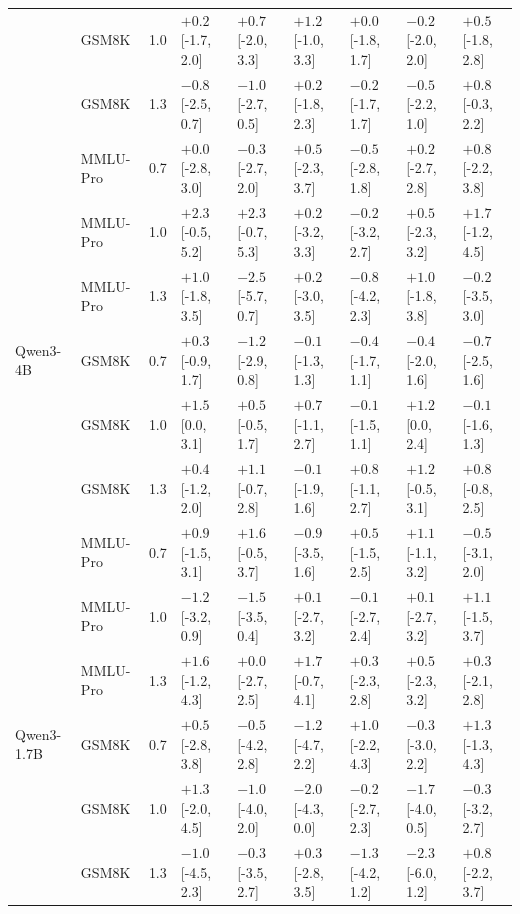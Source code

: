 \begin{tabular}{llcllllll}
 & GSM8K & 1.0 & $+0.2$ [-1.7, 2.0] & $+0.7$ [-2.0, 3.3] & $+1.2$ [-1.0, 3.3] & $+0.0$ [-1.8, 1.7] & $-0.2$ [-2.0, 2.0] & $+0.5$ [-1.8, 2.8] \\
 & GSM8K & 1.3 & $-0.8$ [-2.5, 0.7] & $-1.0$ [-2.7, 0.5] & $+0.2$ [-1.8, 2.3] & $-0.2$ [-1.7, 1.7] & $-0.5$ [-2.2, 1.0] & $+0.8$ [-0.3, 2.2] \\
 & MMLU-Pro & 0.7 & $+0.0$ [-2.8, 3.0] & $-0.3$ [-2.7, 2.0] & $+0.5$ [-2.3, 3.7] & $-0.5$ [-2.8, 1.8] & $+0.2$ [-2.7, 2.8] & $+0.8$ [-2.2, 3.8] \\
 & MMLU-Pro & 1.0 & $+2.3$ [-0.5, 5.2] & $+2.3$ [-0.7, 5.3] & $+0.2$ [-3.2, 3.3] & $-0.2$ [-3.2, 2.7] & $+0.5$ [-2.3, 3.2] & $+1.7$ [-1.2, 4.5] \\
 & MMLU-Pro & 1.3 & $+1.0$ [-1.8, 3.5] & $-2.5$ [-5.7, 0.7] & $+0.2$ [-3.0, 3.5] & $-0.8$ [-4.2, 2.3] & $+1.0$ [-1.8, 3.8] & $-0.2$ [-3.5, 3.0] \\
\midrule
Qwen3-4B & GSM8K & 0.7 & $+0.3$ [-0.9, 1.7] & $-1.2$ [-2.9, 0.8] & $-0.1$ [-1.3, 1.3] & $-0.4$ [-1.7, 1.1] & $-0.4$ [-2.0, 1.6] & $-0.7$ [-2.5, 1.6] \\
 & GSM8K & 1.0 & $\mathbf{+1.5}$ [0.0, 3.1] & $+0.5$ [-0.5, 1.7] & $+0.7$ [-1.1, 2.7] & $-0.1$ [-1.5, 1.1] & $\mathbf{+1.2}$ [0.0, 2.4] & $-0.1$ [-1.6, 1.3] \\
 & GSM8K & 1.3 & $+0.4$ [-1.2, 2.0] & $+1.1$ [-0.7, 2.8] & $-0.1$ [-1.9, 1.6] & $+0.8$ [-1.1, 2.7] & $+1.2$ [-0.5, 3.1] & $+0.8$ [-0.8, 2.5] \\
 & MMLU-Pro & 0.7 & $+0.9$ [-1.5, 3.1] & $+1.6$ [-0.5, 3.7] & $-0.9$ [-3.5, 1.6] & $+0.5$ [-1.5, 2.5] & $+1.1$ [-1.1, 3.2] & $-0.5$ [-3.1, 2.0] \\
 & MMLU-Pro & 1.0 & $-1.2$ [-3.2, 0.9] & $-1.5$ [-3.5, 0.4] & $+0.1$ [-2.7, 3.2] & $-0.1$ [-2.7, 2.4] & $+0.1$ [-2.7, 3.2] & $+1.1$ [-1.5, 3.7] \\
 & MMLU-Pro & 1.3 & $+1.6$ [-1.2, 4.3] & $+0.0$ [-2.7, 2.5] & $+1.7$ [-0.7, 4.1] & $+0.3$ [-2.3, 2.8] & $+0.5$ [-2.3, 3.2] & $+0.3$ [-2.1, 2.8] \\
\midrule
Qwen3-1.7B & GSM8K & 0.7 & $+0.5$ [-2.8, 3.8] & $-0.5$ [-4.2, 2.8] & $-1.2$ [-4.7, 2.2] & $+1.0$ [-2.2, 4.3] & $-0.3$ [-3.0, 2.2] & $+1.3$ [-1.3, 4.3] \\
 & GSM8K & 1.0 & $+1.3$ [-2.0, 4.5] & $-1.0$ [-4.0, 2.0] & $-2.0$ [-4.3, 0.0] & $-0.2$ [-2.7, 2.3] & $-1.7$ [-4.0, 0.5] & $-0.3$ [-3.2, 2.7] \\
 & GSM8K & 1.3 & $-1.0$ [-4.5, 2.3] & $-0.3$ [-3.5, 2.7] & $+0.3$ [-2.8, 3.5] & $-1.3$ [-4.2, 1.2] & $-2.3$ [-6.0, 1.2] & $+0.8$ [-2.2, 3.7] \\

\end{tabular}
